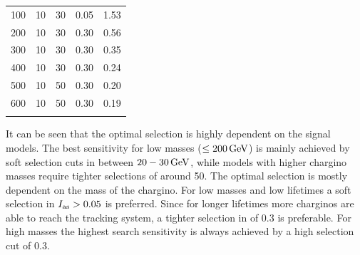 \begin{table}[!h]
{\begin{tabular}{c |c| c| c| c}
100&                          10&                           30&                           0.05&                         1.53\\ 
200&                          10&                           30&                           0.30&                         0.56\\ 
300&                          10&                           30&                           0.30&                         0.35\\ 
400&                          10&                           30&                           0.30&                         0.24\\ 
500&                          10&                           50&                           0.30&                         0.20\\ 
600&                          10&                           50&                           0.30&                         0.19\\ 
\bottomrule
\multicolumn{5}{c}{} \\
\end{tabular}}
\end{table}

It can be seen that the optimal selection is highly dependent on the signal models.
The best sensitivity for low masses ($\leq 200\,\text{Ge}\kern-0.06667em\text{V}$) is mainly achieved by soft selection cuts in \pt between $20-30\,\text{Ge}\kern-0.06667em\text{V}$, while models with higher chargino masses require tighter \pt selections of around 50\gev.
The optimal \ias selection is mostly dependent on the mass of the chargino.
For low masses and low lifetimes a soft selection in $I_{\text{as}}>0.05$ is preferred. 
Since for longer lifetimes more charginos are able to reach the tracking system, a tighter selection in \ias of 0.3 is preferable.
For high masses the highest search sensitivity is always achieved by a high \ias selection cut of 0.3.\\

